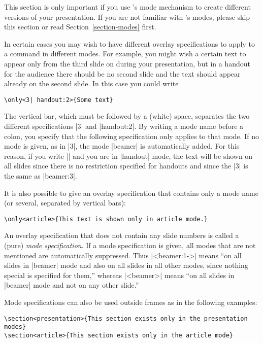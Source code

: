 This section is only important if you use \beamer's mode mechanism
to create different versions of your presentation. If you are not
familiar with \beamer's modes, please skip this section or read
Section~\ref{section-modes} first.

In certain cases you may wish to have different overlay specifications
to apply to a command in different modes.
For example, you might wish a certain text to appear only from the
third slide on during your presentation, but in a handout for the
audience there should be no second slide and the text should appear
already on the second slide. In this case you could write
\begin{verbatim}
\only<3| handout:2>{Some text}
\end{verbatim}

The vertical bar, which must be followed by a (white) space, separates
the two different specifications |3| and |handout:2|. By writing a
mode name before a colon, you specify that the following specification
only applies to that mode. If no mode is given, as in |3|, the mode
|beamer| is automatically added. For this reason, if you write
|| and you are in |handout| mode, the text will be shown
on all slides since there is no restriction specified for handouts and
since the |3| is the same as |beamer:3|.

It is also possible to give an overlay specification that contains
only a mode name (or several, separated by vertical bars):
\begin{verbatim}
\only<article>{This text is shown only in article mode.}
\end{verbatim}
An overlay specification that does not contain any slide numbers is
called a (pure) \emph{mode specification}. If a mode specification is
given, all modes that are not mentioned are automatically
suppressed. Thus |<beamer:1->| means ``on all slides in |beamer| mode
and also on all slides in all other modes, since nothing special is
specified for them,'' whereas |<beamer>| means ``on all slides in
|beamer| mode and not on any other slide.''

Mode specifications can also be used outside frames as in the following
examples:
\begin{verbatim}
\section<presentation>{This section exists only in the presentation modes}
\section<article>{This section exists only in the article mode}
\end{verbatim}

